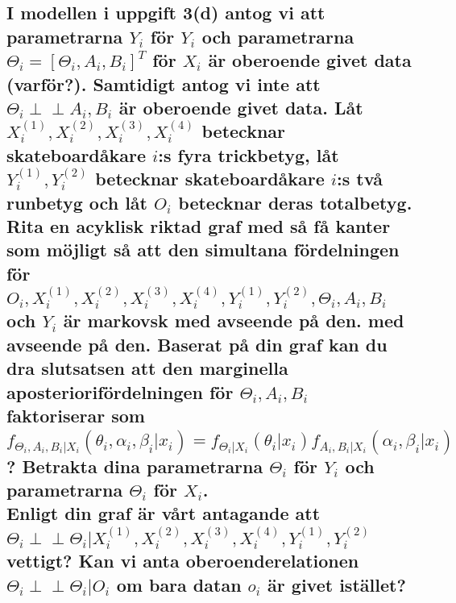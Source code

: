 \documentclass{article}
\newcommand{\independent}{\perp\!\!\!\!\perp}
\begin{document}
\subsection{I modellen i uppgift 3(d) antog vi att parametrarna $Y_i$ för $Y_i$ och parametrarna $\Theta_i = [\Theta_i, A_i, B_i]^T$ för $X_i$ är oberoende givet data (varför?).
Samtidigt antog vi inte att $\Theta_i \independent A_i, B_i$ är oberoende givet data.
Låt $X_i^{(1)}, X_i^{(2)}, X_i^{(3)}, X_i^{(4)}$ betecknar skateboardåkare $i$:s fyra trickbetyg, låt $Y_i^{(1)}, Y_i^{(2)}$ betecknar skateboardåkare $i$:s två runbetyg och låt $O_i$ betecknar deras totalbetyg.
Rita en acyklisk riktad graf med så få kanter som möjligt så att den simultana fördelningen för $O_i, X_i^{(1)}, X_i^{(2)}, X_i^{(3)}, X_i^{(4)}, Y_i^{(1)}, Y_i^{(2)}, \Theta_i, A_i, B_i$ och $Y_i$ är markovsk med avseende på den.
med avseende på den. Baserat på din graf kan du dra slutsatsen att den marginella aposteriorifördelningen för $\Theta_i, A_i, B_i$ faktoriserar som 
\\$f_{\Theta_i, A_i, B_i | X_i}(\theta_i, \alpha_i, \beta_i | x_i) = f_{\Theta_i | X_i}(\theta_i | x_i)f_{A_i, B_i | X_i}(\alpha_i, \beta_i | x_i)$?
Betrakta dina parametrarna $\Theta_i$ för $Y_i$ och parametrarna $\Theta_i$ för $X_i$. \\Enligt din graf är vårt antagande att $\Theta_i \independent \Theta_i | X_i^{(1)}, X_i^{(2)}, X_i^{(3)}, X_i^{(4)}, Y_i^{(1)}, Y_i^{(2)}$ vettigt?
Kan vi anta oberoenderelationen $\Theta_i \independent \Theta_i | O_i$ om bara datan $o_i$ är givet istället?}
\end{document}
